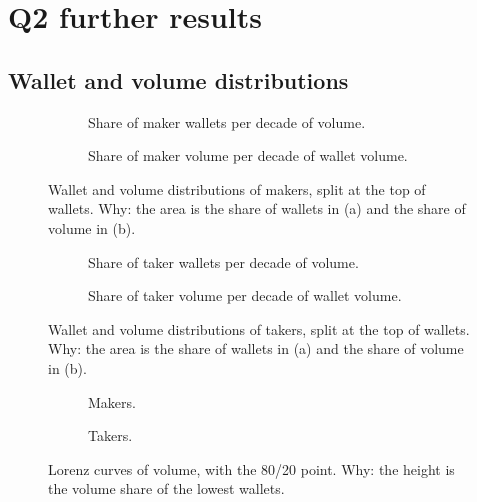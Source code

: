 \section{Q2 further results}\label{sec:app-q2}
\subsection{Wallet and volume distributions}\label{sec:app-q2-dist}
\begin{figure}[H]
\centering
\begin{subfigure}[t]{0.49\linewidth}\centering
{}
\caption{Share of maker wallets per decade of volume.}
\label{fig:wd-maker-count}
\end{subfigure}\hfill
\begin{subfigure}[t]{0.49\linewidth}\centering
{}
\caption{Share of maker volume per decade of wallet volume.}
\label{fig:wd-maker-volume}
\end{subfigure}
\caption{Wallet and volume distributions of makers, split at the top \TopTwentyLabel{} of wallets. Why: the area is the share of wallets in (a) and the share of volume in (b).}%
\label{fig:wd-maker}
\end{figure}

\begin{figure}[H]
\centering
\begin{subfigure}[t]{0.49\linewidth}\centering
{}
\caption{Share of taker wallets per decade of volume.}
\label{fig:wd-taker-count}
\end{subfigure}\hfill
\begin{subfigure}[t]{0.49\linewidth}\centering
{}
\caption{Share of taker volume per decade of wallet volume.}
\label{fig:wd-taker-volume}
\end{subfigure}
\caption{Wallet and volume distributions of takers, split at the top \TopTwentyLabel{} of wallets. Why: the area is the share of wallets in (a) and the share of volume in (b).}%
\label{fig:wd-taker}
\end{figure}

\begin{figure}[H]
\centering
\begin{subfigure}[t]{0.49\linewidth}\centering
{}
\caption{Makers.}
\label{fig:lorenz-maker}
\end{subfigure}\hfill
\begin{subfigure}[t]{0.49\linewidth}\centering
{}
\caption{Takers.}
\label{fig:lorenz-taker}
\end{subfigure}
\caption{Lorenz curves of volume, with the 80/20 point. Why: the height is the volume share of the lowest wallets. }%
\label{fig:lorenz}
\end{figure}

